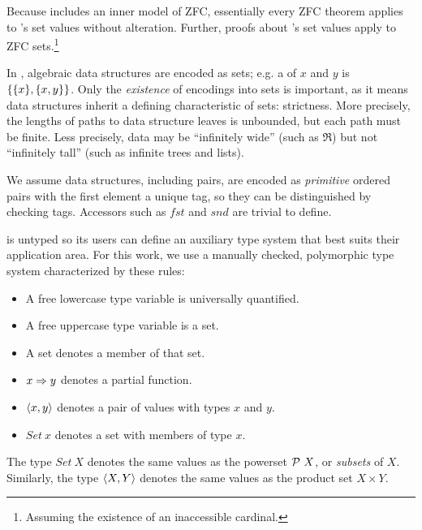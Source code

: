 \documentclass[preprint]{sigplanconf}
\begin{document}
Because \lzfclang includes an inner model of ZFC, essentially every ZFC theorem applies to \lzfclang's set values without alteration.
Further, proofs about \lzfclang's set values apply to ZFC sets.\footnote{Assuming the existence of an inaccessible cardinal.}

In \lzfclang, algebraic data structures are encoded as sets; e.g. a  of $x$ and $y$ is $\{{\{{x}\},\{{x,y}\}}\}$.
Only the \emph{existence} of encodings into sets is important, as it means data structures inherit a defining characteristic of sets: strictness.
More precisely, the lengths of paths to data structure leaves is unbounded, but each path must be finite.
Less precisely, data may be ``infinitely wide'' (such as $\Re$) but not ``infinitely tall'' (such as infinite trees and lists).

We assume data structures, including pairs, are encoded as \emph{primitive} ordered pairs with the first element a unique tag, so they can be distinguished by checking tags.
Accessors such as $fst$ and $snd$ are trivial to define.

\lzfclang is untyped so its users can define an auxiliary type system that best suits their application area.
For this work, we use a manually checked, polymorphic type system characterized by these rules:
\begin{itemize}
	\item A free lowercase type variable is universally quantified.
	\item A free uppercase type variable is a set.
	\item A set denotes a member of that set.
	\item $x \Rightarrow y$ denotes a partial function.
	\item $\langle{x,y}\rangle$ denotes a pair of values with types $x$ and $y$.
	\item $Set~x$ denotes a set with members of type $x$.
\end{itemize}
The type $Set~X$ denotes the same values as the powerset $\mathcal{P}~X$, or \emph{subsets} of $X$.
Similarly, the type $\langle{X,Y}\rangle$ denotes the same values as the product set $X \times Y$.
\end{document}
